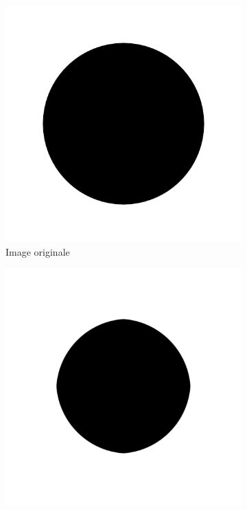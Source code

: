\begin{figure}
    \centering
    \begin{subfigure}{.22\textwidth}
        \centering
        \includegraphics[width=\textwidth]{contenu/resources/images/disk}
        \caption{Image originale\\}
    \end{subfigure}
    \begin{subfigure}{.22\textwidth}
        \centering
        \includegraphics[width=\textwidth]{contenu/resources/images/disk_blur}

\end{subfigure}
\end{figure}
